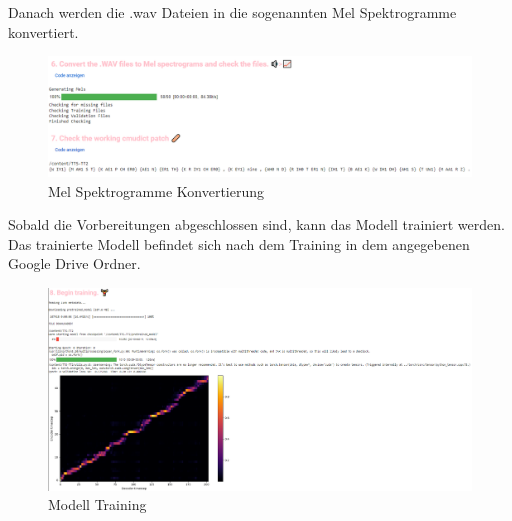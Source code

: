 Danach werden die .wav Dateien in die sogenannten Mel Spektrogramme konvertiert.
\begin{figure}[H]
    \includegraphics[width=1.0\textwidth]{Bilder/AudioTraining4}
    \centering
    \caption{Mel Spektrogramme Konvertierung}
    \label{fig:TrainingPart4}
\end{figure}
Sobald die Vorbereitungen abgeschlossen sind, kann das Modell trainiert werden. Das trainierte Modell befindet sich nach dem Training in dem angegebenen Google Drive Ordner.
\begin{figure}[H]
    \includegraphics[width=1.0\textwidth]{Bilder/AudioTraining5}
    \centering
    \caption{Modell Training}
    \label{fig:TrainingPart5}
\end{figure}
